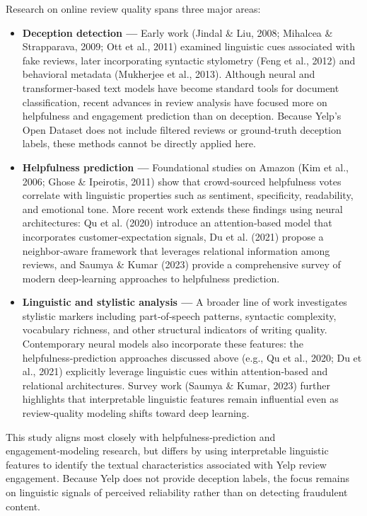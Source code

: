 \documentclass[
]{article}
\begin{document}
Research on online review quality spans three major areas:

\begin{itemize}

\item \textbf{Deception detection —}  
Early work (Jindal \& Liu, 2008; Mihalcea \& Strapparava, 2009; Ott et al., 2011) examined linguistic cues associated with fake reviews, later incorporating syntactic stylometry (Feng et al., 2012) and behavioral metadata (Mukherjee et al., 2013). Although neural and transformer‑based text models have become standard tools for document classification, recent advances in review analysis have focused more on helpfulness and engagement prediction than on deception. Because Yelp’s Open Dataset does not include filtered reviews or ground‑truth deception labels, these methods cannot be directly applied here.

\item \textbf{Helpfulness prediction —}  
Foundational studies on Amazon (Kim et al., 2006; Ghose \& Ipeirotis, 2011) show that crowd‑sourced helpfulness votes correlate with linguistic properties such as sentiment, specificity, readability, and emotional tone. More recent work extends these findings using neural architectures: Qu et al. (2020) introduce an attention‑based model that incorporates customer‑expectation signals, Du et al. (2021) propose a neighbor‑aware framework that leverages relational information among reviews, and Saumya \& Kumar (2023) provide a comprehensive survey of modern deep‑learning approaches to helpfulness prediction.

\item \textbf{Linguistic and stylistic analysis —}  
A broader line of work investigates stylistic markers including part‑of‑speech patterns, syntactic complexity, vocabulary richness, and other structural indicators of writing quality. Contemporary neural models also incorporate these features: the helpfulness‑prediction approaches discussed above (e.g., Qu et al., 2020; Du et al., 2021) explicitly leverage linguistic cues within attention‑based and relational architectures. Survey work (Saumya \& Kumar, 2023) further highlights that interpretable linguistic features remain influential even as review‑quality modeling shifts toward deep learning.

\end{itemize}

This study aligns most closely with helpfulness‑prediction and
engagement‑modeling research, but differs by using interpretable
linguistic features to identify the textual characteristics associated
with Yelp review engagement. Because Yelp does not provide deception
labels, the focus remains on linguistic signals of perceived reliability
rather than on detecting fraudulent content.
\end{document}
